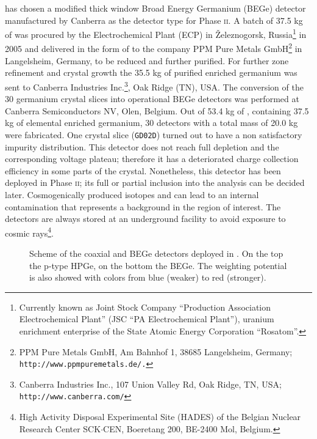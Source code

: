 {\gerda} has chosen a modified thick window Broad Energy Germanium (BEGe) detector manufactured by Canberra as the detector type for Phase \textsc{ii}. A batch of 37.5 kg of  was procured by the Electrochemical Plant (ECP) in Železnogorsk, Russia\footnote{Currently known as Joint Stock Company ``Production Association Electrochemical Plant'' (JSC ``PA Electrochemical Plant''), uranium enrichment enterprise of the State Atomic Energy Corporation ``Rosatom''.} in 2005 and delivered in the form of  to the company PPM Pure Metals GmbH\footnote{PPM Pure Metals GmbH, Am Bahnhof 1, 38685 Langelsheim, Germany; \texttt{http://www.ppmpuremetals.de/.}} in Langelsheim, Germany, to be reduced and further purified. For further zone refinement and crystal growth the 35.5 kg of purified enriched germanium was sent to Canberra Industries Inc.\footnote{Canberra Industries Inc., 107 Union Valley Rd, Oak Ridge, TN, USA; \texttt{http://www.canberra.com/}}, Oak Ridge (TN), USA. The conversion of the 30 germanium crystal slices into operational BEGe detectors was performed at Canberra Semiconductors NV, Olen, Belgium. Out of 53.4 kg of , containing 37.5 kg of elemental enriched germanium, 30 detectors with a total mass of 20.0 kg were fabricated. One crystal slice (\texttt{GD02D}) turned out to have a non satisfactory impurity distribution. This detector does not reach full depletion and the corresponding voltage plateau; therefore it has a deteriorated charge collection efficiency in some parts of the crystal. Nonetheless, this detector has been deployed in {\gerda} Phase \textsc{ii}; its full or partial inclusion into the analysis can be decided later. Cosmogenically produced isotopes  and  can lead to an internal contamination that represents a background in the region of interest. The detectors are always stored at an underground facility to avoid exposure to cosmic rays\footnote{High Activity Disposal Experimental Site (HADES) of the Belgian Nuclear Research Center SCK$\cdot$CEN, Boeretang 200, BE-2400 Mol, Belgium.}.
\begin{figure}
	\makebox[\textwidth]{%
	}%
	\caption{Scheme of the coaxial and BEGe detectors deployed in {\gerda}. On the top the p-type HPGe, on the bottom the BEGe. The weighting potential is also showed with colors from blue (weaker) to red (stronger).}\label{fig:detscheme}
\end{figure}

